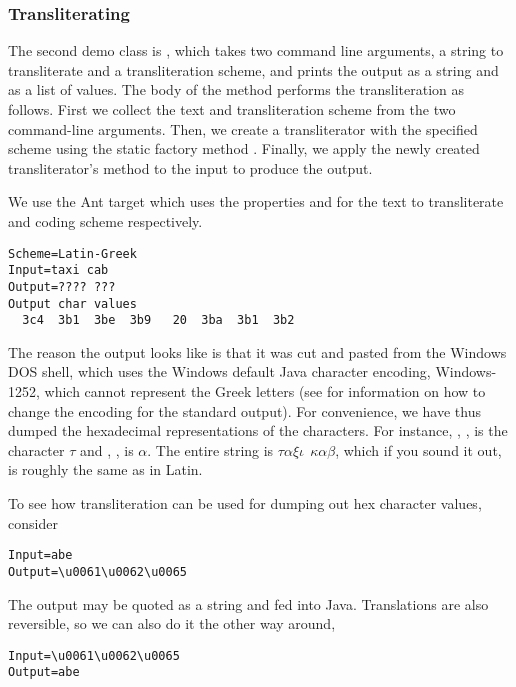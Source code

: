 \subsubsection{Transliterating}

The second demo class is , which takes two command
line arguments, a string to transliterate and a transliteration
scheme, and prints the output as a string and as a list of 
values.  The body of the  method performs the
transliteration as follows.
%
%
First we collect the text and transliteration scheme from the two
command-line arguments.  Then, we create a transliterator with the
specified scheme using the static factory method .
Finally, we apply the newly created transliterator's
 method to the input to produce the output.

We use the Ant target  which uses the properties
 and  for the text to transliterate and coding
scheme respectively.  
%
\begin{verbatim}
Scheme=Latin-Greek
Input=taxi cab
Output=???? ???
Output char values
  3c4  3b1  3be  3b9   20  3ba  3b1  3b2
\end{verbatim}
%
The reason the output looks like  is that it was cut
and pasted from the Windows DOS shell, which uses the Windows default
Java character encoding, Windows-1252, which cannot represent the
Greek letters (see  for information on how to
change the encoding for the standard output).  For convenience, we
have thus dumped the hexadecimal representations of the characters.
For instance, ,
, is the 
character $\tau$ and , , is $\alpha$.  The entire string is $\tau\alpha\xi\iota \ \
\kappa\alpha\beta$, which if you sound it out, is roughly
the same as  in Latin.

To see how transliteration can be used for dumping out
hex character values, consider
%
\begin{verbatim}
Input=abe
Output=\u0061\u0062\u0065
\end{verbatim}
%
The output may be quoted as a string and fed into Java.  Translations
are also reversible, so we can also do it the other way around,
%
\begin{verbatim}
Input=\u0061\u0062\u0065
Output=abe
\end{verbatim}

